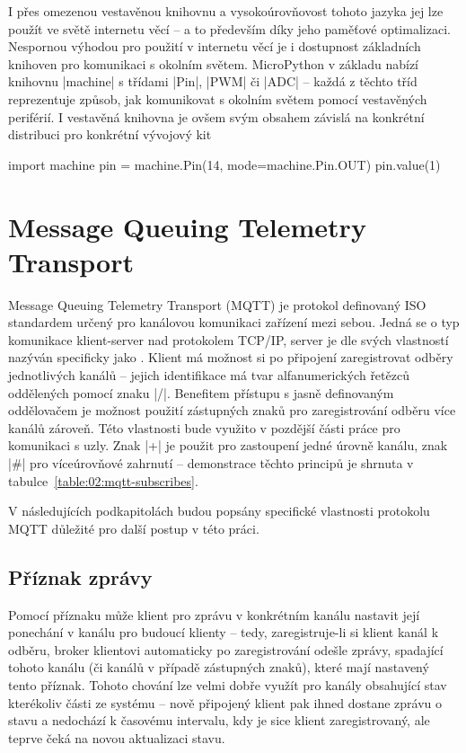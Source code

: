 I přes omezenou vestavěnou knihovnu a vysokoúrovňovost tohoto jazyka jej lze použít ve světě internetu věcí --
a to především díky jeho paměťové optimalizaci.
Nespornou výhodou pro použití v internetu věcí je i dostupnost základních knihoven pro komunikaci s okolním světem.
MicroPython v základu nabízí knihovnu \ic|machine| s třídami \ic|Pin|, \ic|PWM| či \ic|ADC| --
každá z těchto tříd reprezentuje způsob, jak komunikovat s okolním světem pomocí vestavěných periférií.
I vestavěná knihovna je ovšem svým obsahem závislá na konkrétní distribuci pro konkrétní vývojový kit

\begin{code}
    import machine
    pin = machine.Pin(14, mode=machine.Pin.OUT)
    pin.value(1)
\end{code}


\section{Message Queuing Telemetry Transport}\label{sec:message-queuing-telemetry-transport}
Message Queuing Telemetry Transport (MQTT) je protokol definovaný ISO standardem určený pro kanálovou komunikaci zařízení
mezi sebou.
Jedná se o typ komunikace klient-server nad protokolem TCP/IP, server je dle svých vlastností nazýván specificky jako .
Klient má možnost si po připojení zaregistrovat odběry jednotlivých kanálů -- jejich identifikace má tvar
alfanumerických řetězců oddělených pomocí znaku \ic|/|.
Benefitem přístupu s jasně definovaným oddělovačem je možnost použití zástupných znaků pro
zaregistrování odběru více kanálů zároveň.
Této vlastnosti bude využito v pozdější části práce pro komunikaci s uzly.
Znak \ic|+| je použit pro zastoupení jedné úrovně kanálu, znak \ic|#| pro víceúrovňové zahrnutí -- demonstrace těchto
principů je shrnuta v tabulce~\ref{table:02:mqtt-subscribes}.

V následujících podkapitolách budou popsány specifické vlastnosti protokolu MQTT důležité pro další postup v této
práci.

\subsection{Příznak zprávy }\label{subsec:priznak-zpravy-retain}
Pomocí příznaku  může klient pro zprávu v konkrétním kanálu nastavit její ponechání v kanálu pro budoucí klienty
-- tedy, zaregistruje-li si klient kanál k odběru, broker klientovi automaticky po zaregistrování odešle zprávy,
spadající tohoto kanálu (či kanálů v případě zástupných znaků), které mají nastavený tento příznak.
Tohoto chování lze velmi dobře využít pro kanály obsahující stav kterékoliv části ze systému --
nově připojený klient pak ihned dostane zprávu o stavu a nedochází k časovému intervalu, kdy je sice klient
zaregistrovaný, ale teprve čeká na novou aktualizaci stavu.


